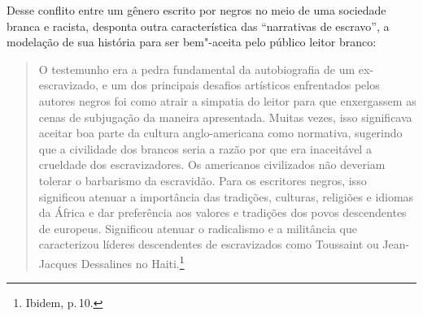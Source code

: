Desse conflito entre um gênero escrito por negros no meio de uma sociedade branca e racista, desponta outra característica das ``narrativas de escravo'', a modelação de sua história para ser bem"-aceita pelo público leitor branco:

\begin{quote}
O testemunho era a pedra fundamental da autobiografia de um ex-escravizado, e um dos principais desafios artísticos enfrentados pelos autores negros foi como atrair a
simpatia do leitor para que enxergassem as cenas de subjugação da maneira apresentada. Muitas vezes, isso significava aceitar boa parte da cultura anglo-americana como
normativa, sugerindo que a civilidade dos brancos seria a
razão por que era inaceitável a crueldade dos escravizadores. Os americanos civilizados não deveriam tolerar o barbarismo da escravidão. Para os escritores negros, isso
significou atenuar a importância das tradições, culturas, religiões e idiomas da África e dar preferência aos valores e tradições dos povos descendentes de europeus. Significou atenuar o radicalismo e a militância que caracterizou líderes descendentes de escravizados como Toussaint ou Jean-Jacques Dessalines no Haiti.\footnote{Ibidem, p.\,10.}
\end{quote}

